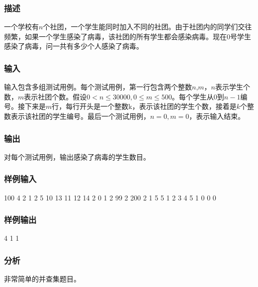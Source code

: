 \subsubsection{描述}
一个学校有$n$个社团，一个学生能同时加入不同的社团。由于社团内的同学们交往频繁，如果一个学生感染了病毒，该社团的所有学生都会感染病毒。现在0号学生感染了病毒，问一共有多少个人感染了病毒。

\subsubsection{输入}
输入包含多组测试用例。每个测试用例，第一行包含两个整数$n$,$m$，$n$表示学生个数，$m$表示社团个数。假设$0 < n \leq 30000, 0 \leq m \leq 500$。每个学生从0到$n-1$编号。接下来是$m$行，每行开头是一个整数k，表示该社团的学生个数，接着是$k$个整数表示该社团的学生编号。最后一个测试用例，$n=0,m=0$，表示输入结束。

\subsubsection{输出}
对每个测试用例，输出感染了病毒的学生数目。

\subsubsection{样例输入}
\begin{Code}
100 4
2 1 2
5 10 13 11 12 14
2 0 1
2 99 2
200 2
1 5
5 1 2 3 4 5
1 0
0 0
\end{Code}

\subsubsection{样例输出}
\begin{Code}
4
1
1
\end{Code}

\subsubsection{分析}
非常简单的并查集题目。

